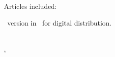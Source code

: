 \iftrue
\begin{flushleft}%
    Articles included:%
    \AtNextBibliography{\small\singlespacing}%
    \printbibliography[%
                heading=none, %
                category=myMediationArticles
                ]%
\end{flushleft}%
\fi

\begin{center}%
    {%
    \ version in \myLanguageLong\ for digital distribution.%
    }%
\end{center}%



\begin{center}%
    \portfolioInstituteShort\ \portfolioCity\\%
    \portfolioCountry, %
    \portfolioDateManuscript%
\end{center}%
